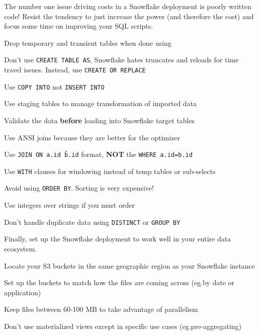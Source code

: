 \documentclass[9pt]{innovativeinnovation-cheatsheet}
\begin{document}
\begin{multicols}{3}

The number one issue driving costs in a Snowflake deployment is poorly written code! Resist the tendency to just increase the power (and therefore the cost) and focus some time on improving your SQL scripts.

\be{}
      \item Drop temporary and transient tables when done using
      \item Don't use \texttt{CREATE TABLE AS}, Snowflake hates truncates and reloads for time travel issues. Instead, use \texttt{CREATE OR REPLACE}
      \bi{}
            \item Use \texttt{COPY INTO} not \texttt{INSERT INTO}
            \item Use staging tables to manage transformation of imported data
            \item Validate the data \textbf{before} loading into Snowflake target tables
      \ei{}
      \item Use ANSI joins because they are better for the optimizer
      \bi{}
            \item Use \texttt{JOIN ON a.id \= b.id} format, \textbf{NOT} the \texttt{WHERE a.id=b.id}
      \ei{}
      \item Use \texttt{WITH} clauses for windowing instead of temp tables or sub-selects
      \item Avoid using \texttt{ORDER BY}. Sorting is very expensive!
      \bi{}
      \item Use integers over strings if you must order
      \ei{}
      \item Don't handle duplicate data using \texttt{DISTINCT} or \texttt{GROUP BY}
\ee{}


Finally, set up the Snowflake deployment to work well in your entire data ecosystem.

\be{}
      \item Locate your S3 buckets in the same geographic region as your Snowflake instance
      \item Set up the buckets to match how the files are coming across (eg.by date or application)
      \item Keep files between 60-100 MB to take advantage of parallelism
      \item Don't use materialized views except in specific use cases (eg.pre-aggregating)
\ee{}



\end{multicols}
\end{document}
